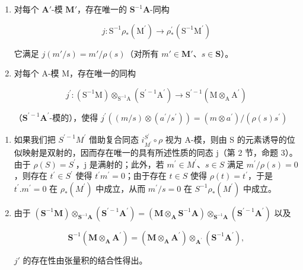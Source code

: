 \begin{enumerate}
\def\labelenumi{(\roman{enumi})}
\tightlist
\item
  对每个 \(\mathbf{A}'\)-模 \(\mathbf{M}'\)，存在唯一的 \(\mathbf{S}^{-1}\mathbf{A}\)-同构

\[
j \colon \mathrm{S} ^ {- 1} \rho_ {*} (\mathrm{M} ^ {\prime}) \rightarrow \rho_ {*} ^ {\prime} (\mathrm{S} ^ {- 1} \mathrm{M} ^ {\prime})
\]

它满足 \(j(m' / s) = m' / \rho(s)\)（对所有 \(m' \in \mathbf{M}'\)、\(s \in \mathbf{S}\)）。

\item
  对每个 A-模 M，存在唯一的同构

\[
j ^ {\prime} \colon (\mathrm{S} ^ {- 1} \mathrm{M}) \otimes_ {\mathrm{S} ^ {- 1} \mathrm{A}} (\mathrm{S} ^ {\prime - 1} \mathrm{A} ^ {\prime}) \rightarrow \mathrm{S} ^ {\prime - 1} (\mathrm{M} \otimes_ {\mathrm{A}} \mathrm{A} ^ {\prime})
\]

（\(\mathbf{S}^{\prime -1}\mathbf{A}^{\prime}\)-模的），使得 \(j^{\prime}((m / s)\otimes (a^{\prime} / s^{\prime})) = (m\otimes a^{\prime}) / (\rho (s)s^{\prime})\)

\end{enumerate}
\begin{enumerate}
\def\labelenumi{(\roman{enumi})}
\item
  如果我们把 \(S^{\prime-1}M^{\prime}\) 借助复合同态 \(i_{M^{\prime}}^{S^{\prime}}\circ\rho\) 视为 A-模，则由 S 的元素诱导的位似映射是双射的，因而存在唯一的具有所述性质的同态 j（第 2 节，命题 3）。由于 \(\rho(S)=S^{\prime}\)，j 是满射的；此外，若 \(m^{\prime}\in M^{\prime}\)、\(s\in S\) 满足 \(m^{\prime}/\rho(s)=0\)，则存在 \(t^{\prime}\in S^{\prime}\) 使得 \(t^{\prime}m^{\prime}=0\)；由于存在 \(t\in S\) 使得 \(\rho(t)=t^{\prime}\)，于是 \(t^{\prime}.m^{\prime}=0\) 在 \(\rho_{*}(M^{\prime})\) 中成立，从而 \(m^{\prime}/s=0\) 在 \(S^{-1}\rho_{*}(M^{\prime})\) 中成立。
\item
  由于 \((\mathbf{S}^{-1}\mathbf{M})\otimes_{\mathbf{S}^{-1}\mathbf{A}}(\mathbf{S}^{\prime -1}\mathbf{A}^{\prime}) = (\mathbf{M}\otimes_{\mathbf{A}}\mathbf{S}^{-1}\mathbf{A})\otimes_{\mathbf{S}^{-1}\mathbf{A}}(\mathbf{S}^{\prime -1}\mathbf{A}^{\prime})\) 以及

\[
\mathbf {S} ^ {- 1} (\mathbf {M} \otimes_ {\mathbf {A}} \mathbf {A} ^ {\prime}) = (\mathbf {M} \otimes_ {\mathbf {A}} \mathbf {A} ^ {\prime}) \otimes_ {\mathbf {A} ^ {\prime}} (\mathbf {S} ^ {- 1} \mathbf {A} ^ {\prime}),
\]

\(j'\) 的存在性由张量积的结合性得出。

\end{enumerate}
